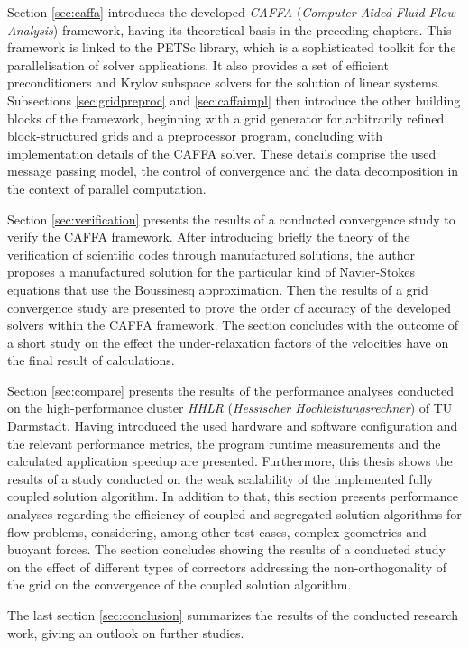 Section \ref{sec:caffa} introduces the developed \emph{CAFFA} (\emph{Computer Aided Fluid Flow Analysis}) framework, having its theoretical basis in the preceding chapters. This framework is linked to the PETSc library, which is a sophisticated toolkit for the parallelisation of solver applications. It also provides a set of efficient preconditioners and Krylov subspace solvers for the solution of linear systems. Subsections \ref{sec:gridpreproc} and \ref{sec:caffaimpl} then introduce the other building blocks of the framework, beginning with a grid generator for arbitrarily refined block-structured grids and a preprocessor program, concluding with implementation details of the CAFFA solver. These details comprise the used message passing model, the control of convergence and the data decomposition in the context of parallel computation.

Section \ref{sec:verification} presents the results of a conducted convergence study to verify the CAFFA framework. After introducing briefly the theory of the verification of scientific codes through manufactured solutions, the author proposes a manufactured solution for the particular kind of Navier-Stokes equations that use the Boussinesq approximation. Then the results of a grid convergence study are presented to prove the order of accuracy of the developed solvers within the CAFFA framework. The section concludes with the outcome of a short study on the effect the under-relaxation factors of the velocities have on the final result of calculations.

Section \ref{sec:compare} presents the results of the performance analyses conducted on the high-performance cluster \emph{HHLR} (\emph{Hessischer Hochleistungsrechner}) of TU Darmstadt. Having introduced the used hardware and software configuration and the relevant performance metrics, the program runtime measurements and the calculated application speedup are presented. Furthermore, this thesis shows the results of a study conducted on the weak scalability of the implemented fully coupled solution algorithm. In addition to that, this section presents performance analyses regarding the efficiency of coupled and segregated solution algorithms for flow problems, considering, among other test cases, complex geometries and buoyant forces. The section concludes showing the results of a conducted study on the effect of different types of correctors addressing the non-orthogonality of the grid on the convergence of the coupled solution algorithm.

The last section \ref{sec:conclusion} summarizes the results of the conducted research work, giving an outlook on further studies.

